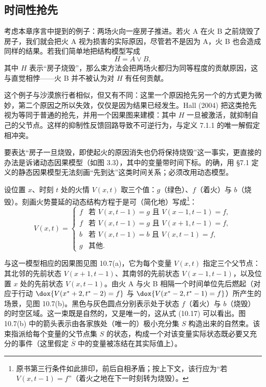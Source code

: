 \subsection{时间性抢先}

考虑本章序言中提到的例子：两场火向一座房子推进。若火 A 在火 B 之前烧毁了房子，我们就会把火 A 视为损害的实际原因，尽管若不是因为 A，火 B 也会造成同样的结果。若我们简单地把结构模型写成
\[
H=A\vee B,
\]
其中 $H$ 表示“房子烧毁”，那么束方法会把两场火都归为同等程度的贡献原因，这与直觉相悖——火 B 并不被认为对 $H$ 有任何贡献。

这个例子与沙漠旅行者相似，但又有不同：这里一个原因抢先另一个的方式更为微妙，第二个原因之所以失效，仅仅是因为结果已经发生。Hall (2004) 把这类抢先视为等同于普通的抢先，并用一个因果图来建模：其中 $H$ 一旦被激活，就抑制自己的父节点。这样的抑制性反馈回路导致不可逆行为，与定义 7.1.1 的唯一解假定相冲突。

要表达“房子一旦烧毁，即使起火的原因消失也仍将保持烧毁”这一事实，更直接的办法是诉诸动态因果模型（如图 3.3），其中的变量带时间下标。的确，用 \S 7.1 定义的静态因果模型无法刻画“先到达”这类时间关系；必须改用动态模型。

设位置 $x$、时刻 $t$ 处的火情 $V(x,t)$ 取三个值：$g$（绿色）、$f$（着火）与 $b$（烧毁）。刻画火势蔓延的动态结构方程于是可（简化地）写成\footnote{原书第三行条件如此排印，前后自相矛盾；按上下文，该行应为“若 $V(x,t-1)=f$”（着火之地在下一时刻转为烧毁）。}：
\begin{equation}
V(x,t)=
\begin{cases}
f & \text{若 } V(x,t-1)=g \text{ 且 } V(x-1,t-1)=f,\\
f & \text{若 } V(x,t-1)=g \text{ 且 } V(x+1,t-1)=f,\\
b & \text{若 } V(x,t-1)=b \text{ 且 } V(x,t-1)=f,\\
g & \text{其他}.
\end{cases}\tag{10.17}
\end{equation}

与这一模型相应的因果图见图 10.7(a)，它为每个变量 $V(x,t)$ 指定三个父节点：其北邻的先前状态 $V(x+1,t-1)$、其南邻的先前状态 $V(x-1,t-1)$，以及位置 $x$ 处的先前状态 $V(x,t-1)$。由火 A 与火 B 相隔一个时间单位先后燃起（对应于行动 $\dox{V(x^*+2,t^*-2)=f}$ 与 $\dox{V(x^*-2,t^*-1)=f}$）所产生的场景，见图 10.7(b)。黑色与灰色圆点分别表示处于状态 $f$（着火）与 $b$（烧毁）的时空区域。这一束既是自然的，又是唯一的，这从式 \textup{(10.17)} 可以看出。图 10.7(b) 中的箭头表示由各家族处（唯一的）极小充分集 $S$ 构造出来的自然束。该束指派给每个变量的父节点集 $S$ 的状态，构成一个对该变量实际状态既必要又充分的事件（这里假定 $\bar S$ 中的变量被冻结在其实际值上）。

